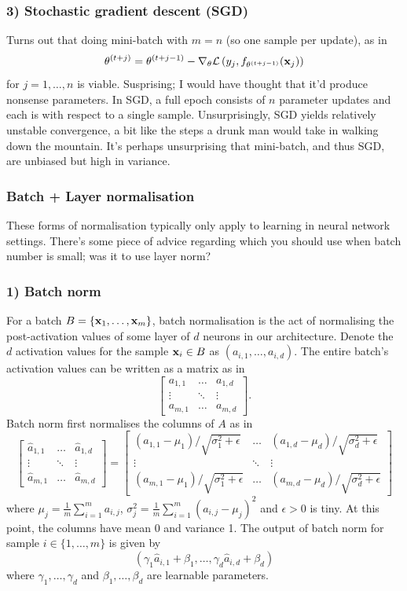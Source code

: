 \documentclass[11pt]{article}
\begin{document}
\subsubsection*{3) Stochastic gradient descent (SGD)}
Turns out that doing mini-batch with $m=n$ (so one sample per update), as in
$$
\theta^{(t+j)}
=
\theta^{(t+j-1)}-\nabla_{\theta}\mathcal{L}\left(y_j,f_{\theta^{(t+j-1)}}(\mathbf{x}_j)\right)
$$
for $j=1,\dots,n$ is viable. Susprising; I would have thought that it'd produce nonsense parameters. In SGD, a full epoch consists of $n$ parameter updates and each is with respect to a single sample. Unsurprisingly, SGD yields relatively unstable convergence, a bit like the steps a drunk man would take in walking down the mountain. It's perhaps unsurprising that mini-batch, and thus SGD, are unbiased but high in variance.

\subsubsection{Batch + Layer normalisation}
These forms of normalisation typically only apply to learning in neural network settings. There's some piece of advice regarding which you should use when batch number is small; was it to use layer norm?

\subsubsection*{1) Batch norm}
For a batch $B=\{\mathbf{x}_1,\dots,\mathbf{x}_m\}$, batch normalisation is the act of normalising the post-activation values of some layer of $d$ neurons in our architecture. Denote the $d$ activation values for the sample $\mathbf{x}_i\in B$ as $(a_{i,1},\dots,a_{i,d})$. The entire batch's activation values can be written as a matrix as in
$$
\begin{bmatrix}
    a_{1,1} & \dots  & a_{1,d}\\
    \vdots  & \ddots & \vdots \\
    a_{m,1} & \dots  & a_{m,d}
\end{bmatrix}.
$$
Batch norm first normalises the columns of $A$ as in
$$
\begin{bmatrix}
    \hat{a}_{1,1} & \dots  & \hat{a}_{1,d}\\
    \vdots        & \ddots & \vdots       \\
    \hat{a}_{m,1} & \dots  & \hat{a}_{m,d}
\end{bmatrix}
=
\begin{bmatrix}
    (a_{1,1}-\mu_1) / \sqrt{\sigma_1^2+\epsilon} & \dots & (a_{1,d}-\mu_d) / \sqrt{\sigma_d^2+\epsilon}\\
    \vdots & \ddots & \vdots \\
    (a_{m,1}-\mu_1) / \sqrt{\sigma_1^2+\epsilon} & \dots & (a_{m,d}-\mu_d) / \sqrt{\sigma_d^2+\epsilon}
\end{bmatrix}
$$
where $\mu_j=\frac{1}{m}\sum_{i=1}^ma_{i,j}$, $\sigma_j^2=\frac{1}{m}\sum_{i=1}^m(a_{i,j}-\mu_j)^2$ and $\epsilon>0$ is tiny. At this point, the columns have mean 0 and variance 1. The output of batch norm for sample $i\in\{1,\dots,m\}$ is given by
$$
(\gamma_1\hat{a}_{i,1}+\beta_1,\dots,\gamma_d\hat{a}_{i,d}+\beta_d)
$$
where $\gamma_1,\dots,\gamma_d$ and $\beta_1,\dots,\beta_d$ are learnable parameters.
\end{document}
